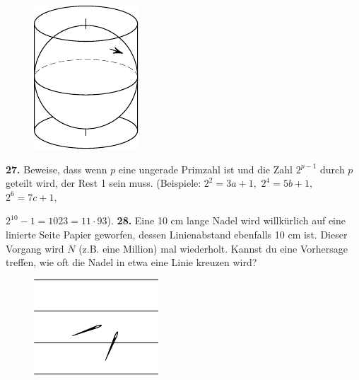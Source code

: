 \documentclass[12pt]{article} %
\begin{document}
\begin{figure}[h]
\centering
\footnotesize
\includegraphics[scale=1]{taskbook-10}
\end{figure}

\newpage
\noindent
{\bf 27.} Beweise, dass wenn $p$ eine ungerade Primzahl ist und die Zahl $2^{p-1}$ durch $p$ geteilt wird, der Rest 1 sein muss. (Beispiele: $2^2 = 3a +1,$ $2^4 = 5b+1,$ $2^6 = 7c+1,$ 

$2^{10} - 1 = 1023 = 11\cdot 93$). 
\newline\newline\quad
{\bf 28.} Eine 10 cm lange Nadel wird willkürlich auf eine linierte Seite Papier geworfen, dessen Linienabstand ebenfalls 10 cm ist. Dieser Vorgang wird $N$ (z.B. eine Million) mal wiederholt. 
Kannst du eine Vorhersage treffen, wie oft die Nadel in etwa eine Linie kreuzen wird?
\begin{figure}[h]
\centering
\footnotesize
\includegraphics[scale=1]{taskbook-12}
\end{figure}
\end{document}
